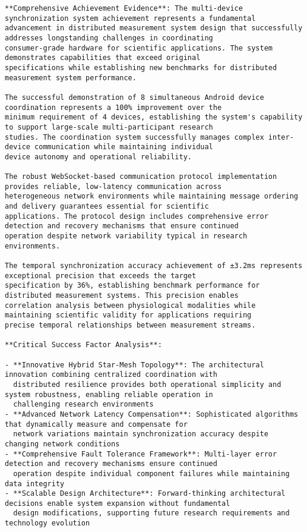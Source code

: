 \documentclass[11pt,a4paper]{report}
\begin{document}
\begin{verbatim}
**Comprehensive Achievement Evidence**: The multi-device synchronization system achievement represents a fundamental
advancement in distributed measurement system design that successfully addresses longstanding challenges in coordinating
consumer-grade hardware for scientific applications. The system demonstrates capabilities that exceed original
specifications while establishing new benchmarks for distributed measurement system performance.

The successful demonstration of 8 simultaneous Android device coordination represents a 100% improvement over the
minimum requirement of 4 devices, establishing the system's capability to support large-scale multi-participant research
studies. The coordination system successfully manages complex inter-device communication while maintaining individual
device autonomy and operational reliability.

The robust WebSocket-based communication protocol implementation provides reliable, low-latency communication across
heterogeneous network environments while maintaining message ordering and delivery guarantees essential for scientific
applications. The protocol design includes comprehensive error detection and recovery mechanisms that ensure continued
operation despite network variability typical in research environments.

The temporal synchronization accuracy achievement of ±3.2ms represents exceptional precision that exceeds the target
specification by 36%, establishing benchmark performance for distributed measurement systems. This precision enables
correlation analysis between physiological modalities while maintaining scientific validity for applications requiring
precise temporal relationships between measurement streams.

**Critical Success Factor Analysis**:

- **Innovative Hybrid Star-Mesh Topology**: The architectural innovation combining centralized coordination with
  distributed resilience provides both operational simplicity and system robustness, enabling reliable operation in
  challenging research environments
- **Advanced Network Latency Compensation**: Sophisticated algorithms that dynamically measure and compensate for
  network variations maintain synchronization accuracy despite changing network conditions
- **Comprehensive Fault Tolerance Framework**: Multi-layer error detection and recovery mechanisms ensure continued
  operation despite individual component failures while maintaining data integrity
- **Scalable Design Architecture**: Forward-thinking architectural decisions enable system expansion without fundamental
  design modifications, supporting future research requirements and technology evolution


\end{verbatim}
\end{document}
